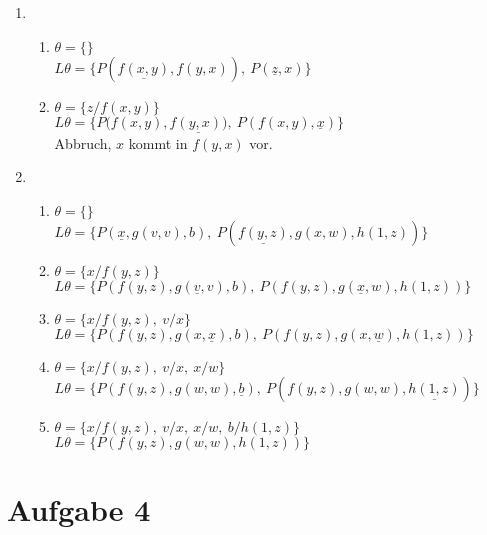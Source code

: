 \documentclass[a4paper,10pt]{article}
\begin{document}
\begin{enumerate}[~~a)]
\begin{enumerate}[~~1.]
    \end{enumerate}

    \item
    \begin{enumerate}[~~1.]
      \item $\theta = \{\}$\\
            $L\theta = \{ P(\underline{f(x, y)}, f(y, x)),~ P(\underline{z}, x) \}$ 
      \item $\theta = \{z/f(x,y)\}$\\
            $L\theta = \{ P(f(x, y), \underline{f(y, x))},~ P(f(x,y), \underline{x}) \}$ \\
            Abbruch, $x$ kommt in $f(y,x)$ vor.

    \end{enumerate}

    \item
    \begin{enumerate}[~~1.]
      \item $\theta = \{\}$\\
            $L\theta = \{ P(\underline{x}, g(v, v), b),~ P(\underline{f(y, z)}, g(x, w), h(1, z)) \}$
      \item $\theta = \{x/f(y,z)\}$\\
            $L\theta = \{ P(f(y,z), g(\underline{v}, v), b),~ P(f(y, z), g(\underline{x}, w), h(1, z)) \}$
      \item $\theta = \{x/f(y,z), ~ v/x\}$\\
            $L\theta = \{ P(f(y,z), g(x, \underline{x}), b),~ P(f(y, z), g(x, \underline{w}), h(1, z)) \}$
      \item $\theta = \{x/f(y,z), ~ v/x, ~ x/w\}$\\
            $L\theta = \{ P(f(y,z), g(w, w), \underline{b}),~ P(f(y, z), g(w, w), \underline{h(1, z)}) \}$
      \item $\theta = \{x/f(y,z), ~ v/x, ~ x/w, ~ b/h(1,z)\}$\\
            $L\theta = \{ P(f(y,z), g(w, w), h(1,z)) \}$
    \end{enumerate}
\end{enumerate}

\section*{Aufgabe 4}
\end{document}
